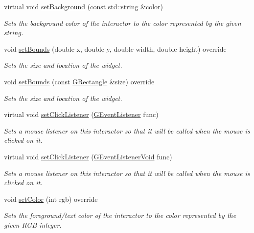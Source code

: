 \begin{DoxyCompactItemize}
virtual void \mbox{\hyperlink{classsgl_1_1GInteractor_ab4677ab2474e68b07aa56605af92a84a}{set\+Background}} (const std\+::string \&color)
\begin{DoxyCompactList}\small\item\em Sets the background color of the interactor to the color represented by the given string. \end{DoxyCompactList}\item 
void \mbox{\hyperlink{classsgl_1_1GLabel_ab9f89f193ad29d66c547cfee29ffde39}{set\+Bounds}} (double x, double y, double width, double height) override
\begin{DoxyCompactList}\small\item\em Sets the size and location of the widget. \end{DoxyCompactList}\item 
void \mbox{\hyperlink{classsgl_1_1GLabel_adb836652705fdc4b7e90b7a3afc56a37}{set\+Bounds}} (const \mbox{\hyperlink{structsgl_1_1GRectangle}{G\+Rectangle}} \&size) override
\begin{DoxyCompactList}\small\item\em Sets the size and location of the widget. \end{DoxyCompactList}\item 
virtual void \mbox{\hyperlink{classsgl_1_1GInteractor_abd40af6921242584d0954f173911b190}{set\+Click\+Listener}} (\mbox{\hyperlink{namespacesgl_ae9f3e9eab70035da1a2b114e21357b25}{G\+Event\+Listener}} func)
\begin{DoxyCompactList}\small\item\em Sets a mouse listener on this interactor so that it will be called when the mouse is clicked on it. \end{DoxyCompactList}\item 
virtual void \mbox{\hyperlink{classsgl_1_1GInteractor_a856414c92df90f56f3877475eb3f8fc4}{set\+Click\+Listener}} (\mbox{\hyperlink{namespacesgl_a54427ce97bb1c2804e4fe2b0a62e8b17}{G\+Event\+Listener\+Void}} func)
\begin{DoxyCompactList}\small\item\em Sets a mouse listener on this interactor so that it will be called when the mouse is clicked on it. \end{DoxyCompactList}\item 
void \mbox{\hyperlink{classsgl_1_1GLabel_a165735fb49fa7db12602d32557cbfe0d}{set\+Color}} (int rgb) override
\begin{DoxyCompactList}\small\item\em Sets the foreground/text color of the interactor to the color represented by the given R\+GB integer. \end{DoxyCompactList}\item 

\end{DoxyCompactItemize}
